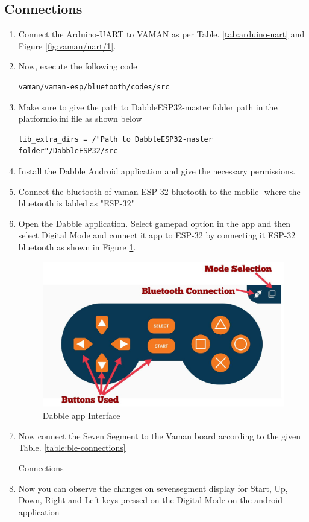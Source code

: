 \subsection{Connections}
\begin{enumerate}[label=\thesection.\arabic*.,ref=\thesection.\theenumi]
\item Connect the Arduino-UART to VAMAN as per Table. \ref{tab:arduino-uart} and Figure \ref{fig:vaman/uart/1}.
  \item Now, execute the following code
\begin{lstlisting}
vaman/vaman-esp/bluetooth/codes/src
\end{lstlisting}
\item Make sure to give the path to DabbleESP32-master folder path in the platformio.ini file as shown below
\begin{lstlisting}
lib_extra_dirs = /"Path to DabbleESP32-master folder"/DabbleESP32/src
\end{lstlisting}
\item Install the Dabble Android application and give the necessary permissions.
\item Connect the bluetooth of vaman ESP-32 bluetooth to the mobile- where the bluetooth is labled as "ESP-32"
\item Open the Dabble application. Select gamepad option in the app and then select Digital Mode and connect it app to ESP-32 by connecting it ESP-32 bluetooth as shown in Figure \ref{fig:ble_app}.
\begin{figure}[!ht]
\centering
\includegraphics[width=\columnwidth]{./vaman/vaman-esp/bluetooth/figs/ble_app.jpg}
\caption{Dabble app Interface}
\label{fig:ble_app}
\end{figure}
\item Now connect the Seven Segment to the Vaman board according to the given Table. \ref{table:ble-connections}
\begin{table}[!ht]
\centering

\caption{Connections}
\label{table:ble-connections}
\end{table}
\item Now you can observe the changes on sevensegment display for Start, Up, Down, Right and Left keys pressed on the Digital Mode on the android application
\end{enumerate}
